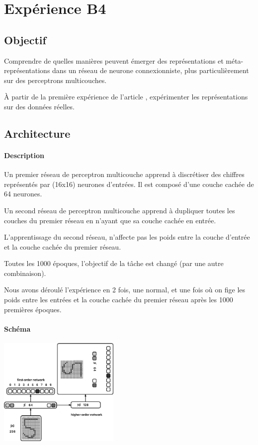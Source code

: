 \section{Expérience B4} \label{expB4}
  \subsection{Objectif}
    Comprendre de quelles manières peuvent émerger des représentations et méta-représentations dans 
    un réseau de neurone connexionniste, plus particulièrement sur des perceptrons multicouches.
    
    
    À partir de la première expérience de l'article \cite{Cleeremans_2007}, expérimenter les représentations
    sur des données réelles.
  
  \subsection{Architecture}
    \paragraph{Description}
      Un premier réseau de perceptron multicouche apprend à discrétiser des chiffres représentés
      par (16x16) neurones d'entrées. Il est composé d'une couche cachée de 64 neurones.
      
      Un second réseau de perceptron multicouche apprend à dupliquer toutes les couches du premier
      réseau en n'ayant que sa couche cachée en entrée.
      
      L'apprentissage du second réseau, n'affecte pas les poids entre la couche d'entrée et la 
      couche cachée du premier réseau.
      
      Toutes les 1000 époques, l'objectif de la tâche est changé (par une autre combinaison).
      
      Nous avons déroulé l'expérience en 2 fois, une normal, et une fois où on fige les poids
      entre les entrées et la couche cachée du premier réseau après les 1000 premières époques.
    \paragraph{Schéma}
      \begin{center}
	\includegraphics[width=220px]{data/expA3/schema.png}
      \end{center}
      
